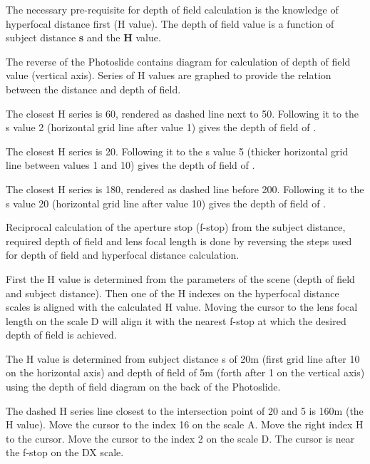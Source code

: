 \begin{multicols*}{3}
{  

The necessary pre-requisite for depth of field calculation is the knowledge of hyperfocal distance first (H value).
The depth of field value is a function of subject distance \textbf{s} and the \textbf{H} value.

The reverse of the Photoslide contains diagram for calculation of depth of field value (vertical axis).
Series of H values are graphed to provide the relation between the distance and depth of field. 

The closest H series is 60, rendered as dashed line next to 50.
Following it to the s value 2 (horizontal grid line after value 1) gives the depth of field of .

The closest H series is 20.
Following it to the s value 5 (thicker horizontal grid line between values 1 and 10) gives the depth of field of .

The closest H series is 180, rendered as dashed line before 200.
Following it to the s value 20 (horizontal grid line after value 10) gives the depth of field of .

\vfill\columnbreak

Reciprocal calculation of the aperture stop (f-stop) from the subject distance, required depth of field and lens focal length is done by reversing the steps used for depth of field and hyperfocal distance calculation.

First the H value is determined from the parameters of the scene (depth of field and subject distance).
Then one of the H indexes on the hyperfocal distance scales is aligned with the calculated H value.
Moving the cursor to the lens focal length on the scale D will align it with the nearest f-stop at which the desired depth of field is achieved.

\footnotesize The H value is determined from subject distance s of 20m (first grid line after 10 on the horizontal axis) and depth of field of 5m (forth after 1 on the vertical axis) using the depth of field diagram on the back of the Photoslide. \normalsize

The dashed H series line closest to the intersection point of 20 and 5 is 160m (the H value).
Move the cursor to the index 16 on the scale A.
Move the right index H to the cursor.
Move the cursor to the index 2 on the scale D.
The cursor is near the f-stop  on the DX scale.
  }
  \end{multicols*}
  

